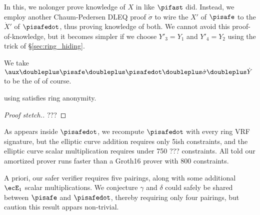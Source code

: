 In this, we nolonger prove knowledge of $X$ in \PedVRF like $\pifast$ did.
Instead, we employ another Chaum-Pedersen DLEQ proof $\dot{\sigma}$ to wire
 the $X'$ of $\pisafe$ to the $\dot{X}'$ of $\pisafedot$,
 thus proving knowledge of both.
We cannot avoid this proof-of-knowledge, but it becomes simpler if
we choose $Y'_3 = Y_1$ and $Y'_4 = Y_2$ using the trick of \S\ref{sec:ring_hiding}.

We take $\aux \doubleplus \pisafe \doubleplus \pisafedot
 \doubleplus \dot{\sigma} \doubleplus \dot{Y}$
 to be the \aux of \PedVRF of course.

\begin{proposition}\label{prop:pisafe_anonymity}
\rVRF using \pisafe satisfies ring anonymity.
\end{proposition}

\begin{proof}[Proof stetch.]
???
\end{proof}


As \openpk appears inside $\pisafedot$, we recompute $\pisafedot$ with
every ring VRF signature, but the elliptic curve addition requires
only 5ish constraints, and the elliptic curve scalar multiplication
requires under 750 ??? constraints. 
All told our amortized prover runs faster than a Groth16 prover
with 800 constraints.

A priori, our safer verifier requires five pairings, along with
some additional $\ecE_1$ scalar multiplications.
We conjecture $\gamma$ and $\delta$ could safely be shared between
$\pisafe$ and $\pisafedot$, thereby requiring only four pairings,
but caution this result appars non-trivial.



